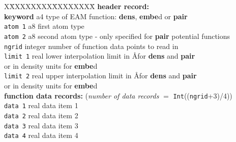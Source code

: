 \begin{tabbing}
X\=XXXXXXXX\=XXXXXXXX\=\kill
{\bf header record:}\\
\> {\bf keyword} \> a4      \> type of EAM function: {\bf dens}, {\bf embe}d or {\bf pair} \\
\> {\tt atom 1}  \> a8      \> first atom type \\
\> {\tt atom 2}  \> a8      \> second atom type - only specified for {\bf pair} potential functions \\
\> {\tt ngrid}   \> integer \> number of function data points to read in \\
\> {\tt limit 1} \> real    \> lower interpolation limit in \AA for {\bf dens} and {\bf pair} \\
\>               \>         \> or in density units for {\bf embe}d \\
\> {\tt limit 2} \> real    \> upper interpolation limit in \AA for {\bf dens} and {\bf pair} \\
\>               \>         \> or in density units for {\bf embe}d \\
{\bf function data records:} ({\em number of data records} $=$ {\tt Int}(({\tt ngrid}+3)/4)) \\
\> {\tt data 1}  \> real    \> data item 1 \\
\> {\tt data 2}  \> real    \> data item 2 \\
\> {\tt data 3}  \> real    \> data item 3 \\
\> {\tt data 4}  \> real    \> data item 4 \\
\end{tabbing}
